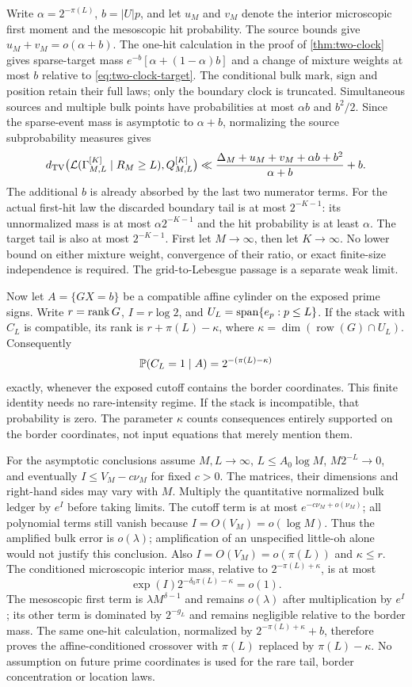 Write $\alpha=2^{-\pi(L)}$, $b=|U|p$, and let $u_M$ and $v_M$ denote
the interior microscopic first moment and the mesoscopic hit probability.
The source bounds give $u_M+v_M=o(\alpha+b)$.
The one-hit calculation in the proof of \cref{thm:two-clock}
gives sparse-target mass $e^{-b}[\alpha+(1-\alpha)b]$ and a change
of mixture weights at most $b$ relative to \eqref{eq:two-clock-target}.
The conditional bulk mark, sign and position retain their full laws;
only the boundary clock is truncated.
Simultaneous sources and multiple bulk points have probabilities at most
$\alpha b$ and $b^2/2$. Since the sparse-event mass is asymptotic to
$\alpha+b$, normalizing the source subprobability measures gives
\[
 d_{\mathrm{TV}}\bigl(\mathcal L(\Gamma_{M,L}^{[K]}\mid R_M\ge L),Q_{M,L}^{[K]}\bigr)
 \ll\frac{\Delta_M+u_M+v_M+\alpha b+b^2}{\alpha+b}+b.
\]
The additional $b$ is already absorbed by the last two numerator terms.
For the actual first-hit law the discarded boundary tail is at most
$2^{-K-1}$: its unnormalized mass is at most $\alpha2^{-K-1}$ and the
hit probability is at least $\alpha$. The target tail is also at most
$2^{-K-1}$. First let $M\to\infty$, then let $K\to\infty$.
No lower bound on either mixture weight, convergence of their ratio, or
exact finite-size independence is required. The grid-to-Lebesgue passage
is a separate weak limit.

Now let $A=\{GX=b\}$ be a compatible affine cylinder on the exposed
prime signs. Write $r=\operatorname{rank} G$, $I=r\log2$, and
$U_L=\operatorname{span}\{e_p:p\le L\}$. If the stack with $C_L$ is compatible,
its rank is $r+\pi(L)-\kappa$, where
$\kappa=\dim(\operatorname{row}(G)\cap U_L)$.
Consequently
\[
 \mathbb P(C_L=1\mid A)=2^{-(\pi(L)-\kappa)}
\]
exactly, whenever the exposed cutoff contains the border coordinates.
This finite identity needs no rare-intensity regime. If the stack is
incompatible, that probability is zero.
The parameter $\kappa$ counts consequences entirely supported on the
border coordinates, not input equations that merely mention them.

For the asymptotic conclusions assume $M,L\to\infty$,
$L\le A_0\log M$, $M2^{-L}\to0$, and eventually
$I\le V_M-c\nu_M$ for fixed $c>0$.
The matrices, their dimensions and right-hand sides may vary with $M$.
Multiply the quantitative normalized bulk ledger by $e^I$ before taking
limits. The cutoff term is at most $e^{-c\nu_M+o(\nu_M)}$; all polynomial
terms still vanish because $I=O(V_M)=o(\log M)$.
Thus the amplified bulk error is $o(\lambda)$; amplification of an
unspecified little-oh alone would not justify this conclusion.
Also $I=O(V_M)=o(\pi(L))$ and $\kappa\le r$. The conditioned
microscopic interior mass, relative to $2^{-\pi(L)+\kappa}$, is at
most
\[
 \exp(I)2^{-\delta_0\pi(L)-\kappa}=o(1).
\]
The mesoscopic first term is $\lambda M^{\delta-1}$ and remains
$o(\lambda)$ after multiplication by $e^I$; its other term is dominated
by $2^{-g_L}$ and remains negligible relative to the border mass.
The same one-hit calculation, normalized by $2^{-\pi(L)+\kappa}+b$,
therefore proves the affine-conditioned crossover with $\pi(L)$ replaced
by $\pi(L)-\kappa$. No assumption on future prime coordinates is used
for the rare tail, border concentration or location laws.

